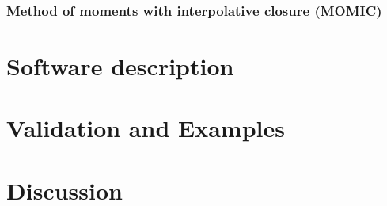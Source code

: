 \documentclass[preprint,12pt,letterpaper]{elsarticle}
\begin{document}
\subsubsection{Method of moments with interpolative closure (MOMIC)}
\label{sss:momic}



\section{Software description}
\label{s:architecture}

%
%


\section{Validation and Examples}
\label{s:examples}



\section{Discussion}
\label{s:discussion}

%
%
%
%
%
\end{document}
